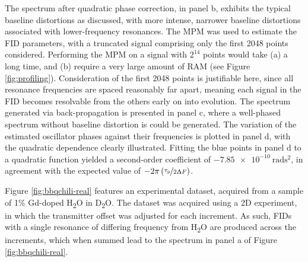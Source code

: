 The spectrum after quadratic phase correction, in panel b, exhibits the typical
baseline distortions as discussed, with more intense, narrower baseline
distortions associated with lower-frequency resonances.
The \ac{MPM} was used to estimate the \ac{FID} parameters,
with a truncated signal comprising only the first 2048 points considered.
Performing the \ac{MPM} on a signal with $2^{14}$ points would take (a) a long
time, and (b) require a very large amount of \ac{RAM} (see Figure
\ref{fig:profiling}).
Consideration of the first 2048 points is justifiable here, since all
resonance frequencies are spaced reasonably far apart, meaning each signal in
the \ac{FID} becomes resolvable from the others early on into evolution.
The spectrum generated via back-propagation is presented in panel c, where a
well-phased spectrum without baseline distortion is could be generated.
The variation of the estimated oscillator phases against their frequencies is
plotted in panel d, with the quadratic dependence clearly illustrated.
Fitting the blue points in panel d to a quadratic function yielded a
second-order coefficient of $\qty{-7.85e-10}{\radian\second\squared}$, in
agreement with the expected value of $-2 \pi \left(\nicefrac{\tau_{\text{p}}}{2
\Updelta F}\right)$.

Figure \ref{fig:bbqchili-real} features an experimental dataset, acquired
from a sample of 1\% Gd-doped H\textsubscript{2}O in D\textsubscript{2}O.
The dataset was acquired using a \ac{2D} experiment, in which the transmitter
offset was adjusted for each increment. As such, \acp{FID} with a single
resonance of differing frequency from H\textsubscript{2}O are produced across
the increments, which when summed lead to the spectrum in panel a of Figure
\ref{fig:bbqchili-real}.

